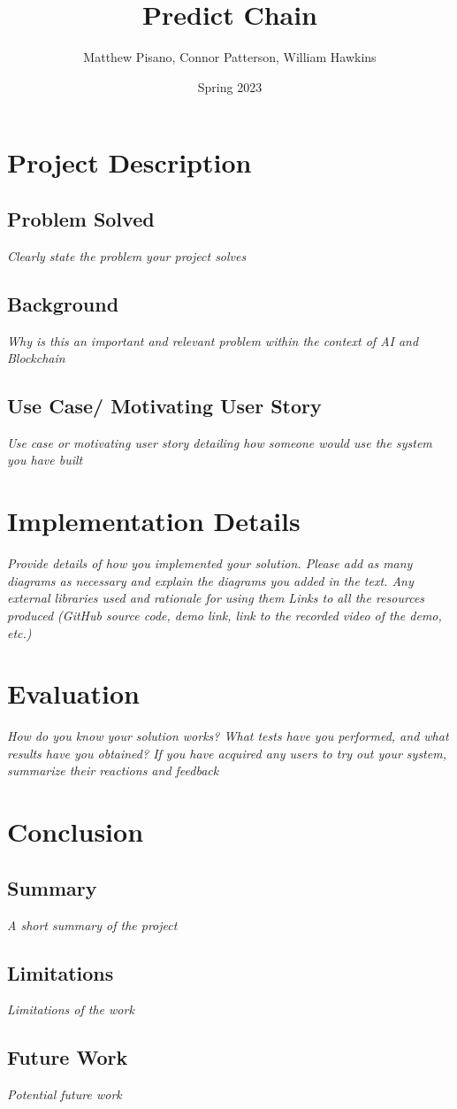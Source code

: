 \documentclass{article}
\title{Predict Chain}
\author{Matthew Pisano, Connor Patterson, William Hawkins}
\date{Spring 2023}
\begin{document}
\maketitle

\section{Project Description}

\subsection{Problem Solved}
\emph{Clearly state the problem your project solves}

\subsection{Background}
\emph{Why is this an important and relevant problem within the context of AI and Blockchain}

\subsection{Use Case/ Motivating User Story}
\emph{Use case or motivating user story detailing how someone would use the system you have built}

\section{Implementation Details}

\emph{Provide details of how you implemented your solution. Please add as many diagrams as necessary and explain the
diagrams you added in the text.
Any external libraries used and rationale for using them
Links to all the resources produced (GitHub source code, demo link, link to the recorded video of the demo, etc.)}

\section{Evaluation}

\emph{How do you know your solution works? What tests have you performed, and what results have you obtained?
If you have acquired any users to try out your system, summarize their reactions and feedback}

\cite{test}

\section{Conclusion}

\subsection{Summary}
\emph{A short summary of the project}

\subsection{Limitations}
\emph{Limitations of the work}

\subsection{Future Work}
\emph{Potential future work}



\end{document}
